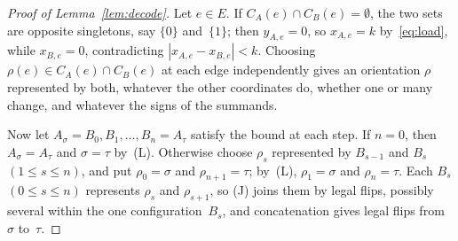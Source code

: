 \begin{proof}[Proof of Lemma~\ref{lem:decode}]
Let $e\in E$. If $C_A(e)\cap C_B(e)=\emptyset$, the two sets are opposite
singletons, say $\{0\}$ and~$\{1\}$; then $y_{A,e}=0$, so $x_{A,e}=k$
by~\eqref{eq:load}, while $x_{B,e}=0$, contradicting
$|x_{A,e}-x_{B,e}|<k$. Choosing $\rho(e)\in C_A(e)\cap C_B(e)$ at each edge
independently gives an orientation $\rho$ represented by both, whatever
the other coordinates do, whether one or many change, and whatever the
signs of the summands.

Now let $A_\sigma=B_0,B_1,\dots,B_n=A_\tau$ satisfy the bound at each step.
If $n=0$, then $A_\sigma=A_\tau$ and $\sigma=\tau$ by~(L). Otherwise choose
$\rho_s$ represented by $B_{s-1}$ and $B_s$ $(1\le s\le n)$, and put
$\rho_0=\sigma$ and $\rho_{n+1}=\tau$; by~(L), $\rho_1=\sigma$ and
$\rho_n=\tau$. Each $B_s$ $(0\le s\le n)$ represents $\rho_s$ and
$\rho_{s+1}$, so (J) joins them by legal flips, possibly several within
the one configuration~$B_s$, and concatenation gives legal flips from
$\sigma$ to~$\tau$.
\end{proof}

